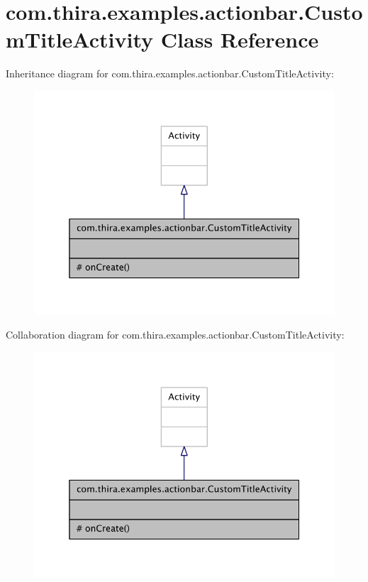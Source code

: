 \hypertarget{classcom_1_1thira_1_1examples_1_1actionbar_1_1_custom_title_activity}{\section{com.\-thira.\-examples.\-actionbar.\-Custom\-Title\-Activity Class Reference}
\label{classcom_1_1thira_1_1examples_1_1actionbar_1_1_custom_title_activity}
}


Inheritance diagram for com.\-thira.\-examples.\-actionbar.\-Custom\-Title\-Activity\-:
\nopagebreak
\begin{figure}[H]
\begin{center}
\leavevmode
\includegraphics[width=338pt]{classcom_1_1thira_1_1examples_1_1actionbar_1_1_custom_title_activity__inherit__graph}
\end{center}
\end{figure}


Collaboration diagram for com.\-thira.\-examples.\-actionbar.\-Custom\-Title\-Activity\-:
\nopagebreak
\begin{figure}[H]
\begin{center}
\leavevmode
\includegraphics[width=338pt]{classcom_1_1thira_1_1examples_1_1actionbar_1_1_custom_title_activity__coll__graph}
\end{center}
\end{figure}
